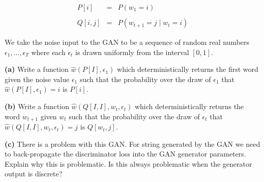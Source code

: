 \documentclass{article}
\newcommand{\solution}[1]{}
\begin{document}
\begin{eqnarray*}
  P[i] & = & P(w_1 = i) \\
  \\
  Q[i,j] & = & P(w_{t+1} = j\;|\; w_t = i)
\end{eqnarray*}

We take the noise input to the GAN to be a sequence of random real numbers $\epsilon_1,\ldots,\epsilon_T$ where each $\epsilon_t$ is drawn uniformly from the interval $[0,1]$.

{\bf (a)} Write a function $\hat{w}(P[I],\epsilon_1)$ which deterministically returns the first word given the noise value $\epsilon_1$ such that the probability over the draw of $\epsilon_1$
that $\hat{w}(P[I],\epsilon_1) = i$ is $P[i]$.

\solution{
  We can take $\hat{w}(P[I],\epsilon_1)$ to be the unique $i$ such that $\epsilon_1 \in \left[\left(\sum_{j<i} P[j]\right),\;\left(\sum_{j \leq i} \;P[j]\right)\right]$
}

{\bf (b)} Write a function $\hat{w}(Q[I,I],w_t,\epsilon_t)$ which deterministically returns the word $w_{t+1}$ given $w_t$ such that the probability over the draw of $\epsilon_t$
that $\hat{w}(Q[I,I],w_t,\epsilon_t) = j$ is $Q[w_t,j]$.

\solution{
  We can take $\hat{w}(Q[I,I],w_t,\epsilon_t)$ to be the unique $w_j$ such that $\epsilon_t \in \left[\left(\sum_{j<i} Q[w_t,j]\right),\;\left(\sum_{k \leq j} \;Q[w_t,j]\right)\right]$
}

{\bf (c)} There is a problem with this GAN.  For string generated by the GAN we need to back-propagate the discriminator loss into the GAN generator parameters.  Explain why this is problematic.
Is this always problematic when the generator output is discrete?

\solution{Yes, there is a problem whever $s$ is discrete. A discrete output will not change under differential updates to the GAN parameters.  Hence the gradient of the discriminator loss
  with respect to the generator parameters is zero.  This will happen for any GAN generatng a discrete output. While there are approaches one can try for discrete GANs, GANs are most effective for modeling
  continuous objects like sounds and images.  It does not help to have the GAN sample from a transformer model. To get a gradient on the generator parameters we need a gradient of the discriminator loss with
  respect to a continuous signal $s$ being generated by the generator.}

\medskip
\end{document}
